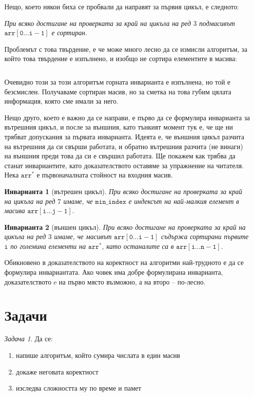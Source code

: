 \documentclass{article}
\theoremstyle{definition}
\theoremstyle{plain}
\newtheorem*{invariant}{Инварианта}
\theoremstyle{remark}
\newtheorem{problem}{Задача}
\theoremstyle{definition}
\begin{document}
Нещо, което някои биха се пробвали да направят за първия цикъл, е следното:
\begin{center}
    \textit{При всяко достигане на проверката за край на цикъла на ред $3$ подмасивът $\mathtt{arr[0 \dots i - 1]}$ е сортиран.}
\end{center}

Проблемът с това твърдение, е че може много лесно да се измисли алгоритъм, за който това твърдение е изпълнено, и изобщо не сортира елементите в масива:
\inputminted[linenos]{c++}{algorithms/trust_me_it_sorts.cpp}

Очевидно този за този алгоритъм горната инварианта е изпълнена, но той е безсмислен.
Получаваме сортиран масив, но за сметка на това губим цялата информация, която сме имали за него.

Нещо друго, което е важно да се направи, е първо да се формулира инварианта за вътрешния цикъл, и после за външния, като тънкият момент тук е, че ще ни трябват допускания за първата инварианта.
Идеята е, че външния цикъл разчита на вътрешния да си свърши работата, и обратно вътрешния разчита (не винаги) на външния преди това да си е свършил работата.
Ще покажем как трябва да станат инвариантите, като доказателството оставяме за упражнение на читателя.
Нека $\mathtt{arr^*}$ е първоначалната стойност на входния масив.
\begin{invariant}[вътрешен цикъл]
    При всяко достигане на проверката за край на цикъла на ред $7$ имаме, че $\mathtt{min\_index}$ е индексът на най-малкия елемент в масива $\mathtt{arr[i \dots j - 1]}$.
\end{invariant}

\begin{invariant}[външен цикъл]
    При всяко достигане на проверката за край на цикъла на ред $3$ имаме, че масивът $\mathtt{arr[0 \dots i - 1]}$ съдържа сортирани първите $\mathtt{i}$ по големина елементи на $\mathtt{arr^*}$, като останалите са в $\mathtt{arr[i \dots n - 1]}$.
\end{invariant}

Обикновено в доказателството на коректност на алгоритми най-трудното е да се формулира инвариантата.
Ако човек има добре формулирана инварианта, доказателството e на първо място възможно, а на второ -- по-лесно.

\section*{Задачи}

\begin{problem}
Да се:
\begin{enumerate}
    \item напише алгоритъм, който сумира числата в един масив
    \item докаже неговата коректност
    \item изследва сложността му по време и памет
\end{enumerate}
\end{problem}
\end{document}
